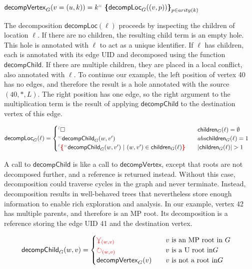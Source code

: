 \begin{definition}
    $\mathsf{decompVertex}_{G}(v = (u,k)) = \genericTerm{u}{\mathsf{decompLoc}_{G}((v,p))}$
\end{definition}

The decomposition $\mathsf{decompLoc}(\ell)$ proceeds by inspecting the children of location $\ell$. If there are no children, the resulting child term is an empty hole. This hole is annotated with $\ell$ to act as a unique identifier. If $\ell$ has children, each is annotated with its edge UID and decomposed using the function $\mathsf{decompChild}$. If there are multiple children, they are placed in a local conflict, also annotated with $\ell$. To continue our example, the left position of vertex 40 has no edges, and therefore the result is a hole annotated with the source $(40, \texttt{*}, L)$. The right position has one edge, so the right argument to the multiplication term is the result of applying $\mathsf{decompChild}$ to the destination vertex of this edge. 

\begin{definition}
\begin{align*}
    \mathsf{decompLoc}_{G}(\ell) &= \begin{cases}
        \ehole &\quad \mathsf{children}_{G}(\ell) = \emptyset \\ \eid{w}{}{\mathsf{decompChild}_G(w, v')} &\quad abs{\mathsf{children}_{G}(\ell)} = 1\\ \conflictHoleTerm{\ell}{\eid{w}{}{\mathsf{decompChild}_G(w, v')} \SuchThat{(w,v') \in \mathsf{children}_{G}(\ell)}} &\quad \abs{\mathsf{children}_{G}(\ell)} > 1 \\
    \end{cases}
\end{align*}
\end{definition}

A call to $\mathsf{decompChild}$ is like a call to $\mathsf{decompVertex}$, except that roots are not decomposed further, and a reference is returned instead. Without this case, decomposition could traverse cycles in the graph and never terminate. Instead, decomposition results in well-behaved trees that nevertheless store enough information to enable rich exploration and analysis. In our example, vertex 42 has multiple parents, and therefore is an MP root. Its decomposition is a reference storing the edge UID 41 and the destination vertex.

\begin{definition}
\begin{align*}
    \mathsf{decompChild}_G(w, v)  &= \begin{cases}
        \textcolor{red}{\curlyveedownarrow_{(w,v)}}  &\quad v\text{ is an MP root in } G\\
        \textcolor{red}{\circlearrowright_{(w,v)}}  &\quad v\text{ is a U root in} G\\
        \mathsf{decompVertex}_{G}(v) &\quad v\text{ is not a root in} G
    \end{cases} 
\end{align*}
\end{definition}

